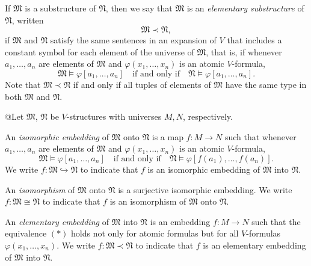 \documentclass{scrartcl}
\newcommand{\FM}{\mathfrak{M}}
\newcommand{\FN}{\mathfrak{N}}
\begin{document}
If $\mathfrak{M}$ is a substructure of $\mathfrak{N}$, then we say that $\mathfrak{M}$ is an \emph{elementary substructure} of $\mathfrak{N}$, written 
\[
\mathfrak{M}\prec\mathfrak{N},
\]
if $\FM$ and $\FN$ satisfy the same sentences in an expansion of $V$ that includes a constant symbol for each element of the universe of $\mathfrak{M}$, that is, if whenever $a_1,\dots, a_n$ are elements of $\mathfrak{M}$ and $ \varphi(x_1,\dots, x_n)$ is an atomic  $V$-formula,
\[
\mathfrak{M}\models \varphi[a_1,\dots, a_n]
\quad\text{if and only if}\quad
\mathfrak{N} \models \varphi[a_1,\dots, a_n].
\]
Note that $\mathfrak{M}\prec\mathfrak{N}$ if and only if all tuples of elements of $\FM$ have the same type in both $\FM$ and $\FN$.

\begin{definition}
@Let $\mathfrak{M}$, $\mathfrak{N}$ be $V$-structures with universes $M,N$, respectively.

An \emph{isomorphic embedding} of $\FM$ onto $\FN$ is a map $f:M\to N$ such that
whenever $a_1,\dots, a_n$ are elements of $\mathfrak{M}$ and $ \varphi(x_1,\dots, x_n)$ is an atomic $V$-formula, 
\[
\tag{*}
\mathfrak{M}\models \varphi[a_1,\dots, a_n]
\quad\text{if and only if}\quad
\mathfrak{N} \models \varphi[f(a_1),\dots, f(a_n)].
\]
We write $f:\FM\hookrightarrow\FN$ to indicate that  $f$ is an isomorphic embedding of $\FM$ into $\FN$.

An \emph{isomorphism} of $\FM$ onto $\FN$ is a surjective isomorphic embedding. We write $f:\FM\cong\FN$ to indicate that  $f$ is an isomorphism of $\FM$ onto $\FN$.

An \emph{elementary embedding} of $\FM$ into $\FN$ is an embedding $f:M\to N$ such that the equivalence $(*)$ holds not only for atomic formulas but for all  $V$-formulas $ \varphi(x_1,\dots, x_n)$. We write $f:\FM\prec\FN$ to indicate that  $f$ is an elementary embedding of $\FM$ into $\FN$.

\end{definition}
\end{document}
